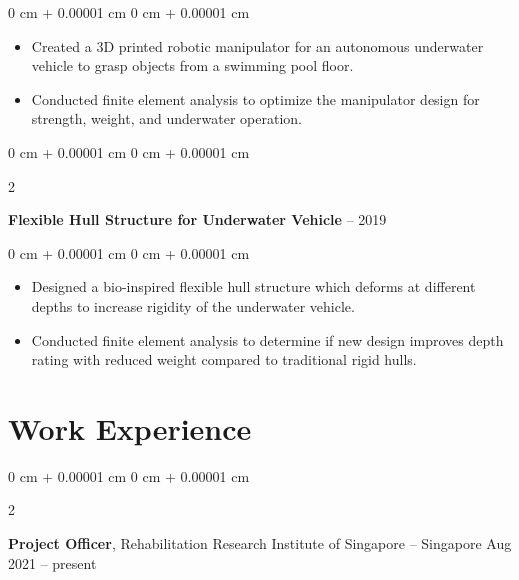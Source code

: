 \documentclass[10pt, letterpaper]{article}
\newenvironment{highlights}{
    \begin{itemize}[
        topsep=0.10 cm,
        parsep=0.10 cm,
        partopsep=0pt,
        itemsep=0pt,
        leftmargin=0 cm + 10pt
    ]
}{
    \end{itemize}
} %
\newenvironment{onecolentry}{
    \begin{adjustwidth}{
        0 cm + 0.00001 cm
    }{
        0 cm + 0.00001 cm
    }
}{
    \end{adjustwidth}
} %
\newenvironment{twocolentry}[2][]{
    \onecolentry
    \def\secondColumn{#2}
    \setcolumnwidth{\fill, 4.5 cm}
    \begin{paracol}{2}
}{
    \switchcolumn \raggedleft \secondColumn
    \end{paracol}
    \endonecolentry
} %
\begin{document}
        \vspace{0.10 cm}
        \begin{onecolentry}
            \begin{highlights}
                \item Created a 3D printed robotic manipulator for an autonomous underwater vehicle to grasp objects from a swimming pool floor.
                \item Conducted finite element analysis to optimize the manipulator design for strength, weight, and underwater operation.
            \end{highlights}
        \end{onecolentry}


        \vspace{0.2 cm}

        \begin{twocolentry}{
            2018 -- 2019
        }
            \textbf{Flexible Hull Structure for Underwater Vehicle}\end{twocolentry}

        \vspace{0.10 cm}
        \begin{onecolentry}
            \begin{highlights}
                \item Designed a bio-inspired flexible hull structure which deforms at different depths to increase rigidity of the underwater vehicle.
                \item Conducted finite element analysis to determine if new design improves depth rating with reduced weight compared to traditional rigid hulls.
            \end{highlights}
        \end{onecolentry}



    
    \section{Work Experience}



        
        \begin{twocolentry}{
            Aug 2021 – present
        }
            \textbf{Project Officer}, Rehabilitation Research Institute of Singapore -- Singapore\end{twocolentry}
\end{document}

